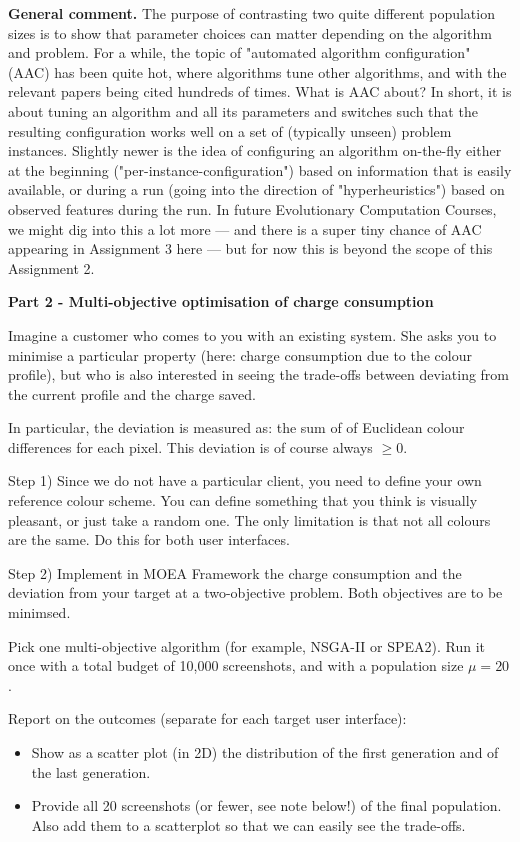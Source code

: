 \documentclass{pracs}
\begin{document}
\textbf{General comment.} The purpose of contrasting two quite different population sizes is to show that parameter choices can matter depending on the algorithm and problem. For a while, the topic of "automated algorithm configuration" (AAC) has been quite hot, where algorithms tune other algorithms, and with the relevant papers being cited hundreds of times. What is AAC about? In short, it is about tuning an algorithm and all its parameters and switches such that the resulting configuration works well on a set of (typically unseen) problem instances.
Slightly newer is the idea of configuring an algorithm on-the-fly either at the beginning ("per-instance-configuration") based on information that is easily available, or during a run (going into the direction of "hyperheuristics") based on observed features during the run.
In future Evolutionary Computation Courses, we might dig into this a lot more --- and there is a super tiny chance of AAC appearing in Assignment 3 here --- but for now this is beyond the scope of this Assignment 2.

\noindent\textbf{Part 2 - Multi-objective optimisation of charge consumption}

Imagine a customer who comes to you with an existing system. She asks you to minimise a particular property (here: charge consumption due to the colour profile), but who is also interested in seeing the trade-offs between deviating from the current profile and the charge saved.

In particular, the deviation is measured as: the sum of of Euclidean colour differences for each pixel. This deviation is of course always $\geq0$.

Step 1) Since we do not have a particular client, you need to define your own reference colour scheme. You can define something that you think is visually pleasant, or just take a random one. The only limitation is that not all colours are the same. Do this for both user interfaces.

Step 2) Implement in MOEA Framework the charge consumption and the deviation from your target at a two-objective problem. Both objectives are to be minimsed.

Pick one multi-objective algorithm (for example, NSGA-II or SPEA2). Run it once with a total budget of 10,000 screenshots, and with a population size $\mu=20$.

Report on the outcomes (separate for each target user interface):
\begin{itemize}
\item Show as a scatter plot (in 2D) the distribution of the first generation and of the last generation.
\item Provide all 20 screenshots (or fewer, see note below!) of the final population. Also add them to a scatterplot so that we can easily see the trade-offs.
\end{itemize}
\end{document}
